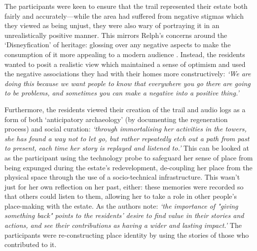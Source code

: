 The participants were keen to ensure that the trail represented their estate both fairly and accurately---while the area had suffered from negative stigmas which they viewed as being unjust, they were also wary of portraying it in an unrealistically positive manner. This mirrors Relph's concerns around the `Disneyfication' of heritage: glossing over any negative aspects to make the consumption of it more appealing to a modern audience \citep{Relph2018}. Instead, the residents wanted to posit a realistic view which maintained a sense of optimism and used the negative associations they had with their homes more constructively: \textit{`We are doing this because we want people to know that everywhere you go there are going to be problems, and sometimes you can make a negative into a positive thing.'}

Furthermore, the residents viewed their creation of the trail and audio logs as a form of both `anticipatory archaeology' (by documenting the regeneration process) and social curation: \textit{`through immortalising her activities in the towers, she has found a way not to let go, but rather repeatedly etch out a path from past to present, each time her story is replayed and listened to.'} This can be looked at as the participant using the technology probe to safeguard her sense of place from being expunged during the estate's redevelopment, de-coupling her place from the physical space through the use of a socio-technical infrastructure. This wasn't just for her own reflection on her past, either: these memories were recorded so that others could listen to them, allowing her to take a role in other people's place-making with the estate. As the authors note: \textit{`the importance of "giving something back" points to the residents' desire to find value in their stories and actions, and see their contributions as having a wider and lasting impact.'} The participants were re-constructing place identity by using the stories of those who contributed to it.

